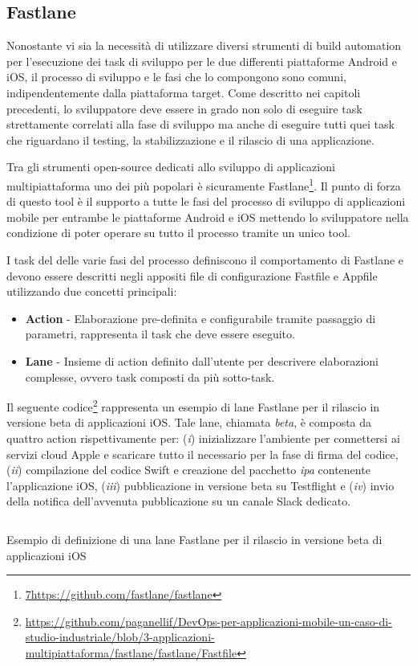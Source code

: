 \subsection{Fastlane}
Nonostante vi sia la necessità di utilizzare diversi strumenti di build automation per l'esecuzione dei task di sviluppo per le due differenti piattaforme Android e iOS, il processo di sviluppo e le fasi che lo compongono sono comuni, indipendentemente dalla piattaforma target. Come descritto nei capitoli precedenti, lo sviluppatore deve essere in grado non solo di eseguire task strettamente correlati alla fase di sviluppo ma anche di eseguire tutti quei task che riguardano il testing, la stabilizzazione e il rilascio di una applicazione.

Tra gli strumenti open-source dedicati allo sviluppo di applicazioni multipiattaforma uno dei più popolari è sicuramente Fastlane\footnote{\href{7https://github.com/fastlane/fastlane}{7https://github.com/fastlane/fastlane}}. Il punto di forza di questo tool è il supporto a tutte le fasi del processo di sviluppo di applicazioni mobile per entrambe le piattaforme Android e iOS mettendo lo sviluppatore nella condizione di poter operare su tutto il processo tramite un unico tool.

I task del delle varie fasi del processo definiscono il comportamento di Fastlane e devono essere descritti negli appositi file di configurazione Fastfile e Appfile utilizzando due concetti principali:

\begin{itemize}
    \item \textbf{Action} - Elaborazione pre-definita e configurabile tramite passaggio di parametri, rappresenta il task che deve essere eseguito.
    \item \textbf{Lane} - Insieme di action definito dall'utente per descrivere elaborazioni complesse, ovvero task composti da più sotto-task.
\end{itemize}

Il seguente codice\footnote{\href{https://github.com/paganellif/DevOps-per-applicazioni-mobile-un-caso-di-studio-industriale/blob/3-applicazioni-multipiattaforma/fastlane/fastlane/Fastfile}{https://github.com/paganellif/DevOps-per-applicazioni-mobile-un-caso-di-studio-industriale/blob/3-applicazioni-multipiattaforma/fastlane/fastlane/Fastfile}} rappresenta un esempio di lane Fastlane per il rilascio in versione beta di applicazioni iOS. Tale lane, chiamata \textit{beta}, è composta da quattro action rispettivamente per: (\textit{i}) inizializzare l'ambiente per connettersi ai servizi cloud Apple e scaricare tutto il necessario per la fase di firma del codice, (\textit{ii}) compilazione del codice Swift e creazione del pacchetto \textit{ipa} contenente l'applicazione iOS, (\textit{iii}) pubblicazione in versione beta su Testflight e (\textit{iv}) invio della notifica dell'avvenuta pubblicazione su un canale Slack dedicato.

\begin{listing}[H]
    \inputminted{ruby}{code/4-fastlane}
    \caption{Esempio di definizione di una lane Fastlane per il rilascio in versione beta di applicazioni iOS}
\end{listing}